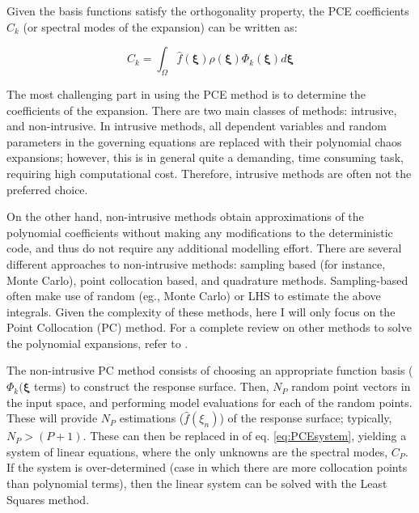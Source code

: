 \documentclass[12pt]{article}
\begin{document}
Given the basis functions satisfy the orthogonality property, the PCE coefficients $C_{k}$  (or spectral modes of the expansion) can be written as:


\begin{equation}
C_{k}=\int^{}_{\Omega}\hat f(\mathbf{\xi}) \rho (\mathbf{\xi})\Phi_{k}(\mathbf{\xi})d\mathbf{\xi}
\end{equation}


The most challenging part in using the PCE method is to determine the coefficients of the expansion. There are two main classes of methods: intrusive, and non-intrusive. In intrusive methods, all dependent variables and random parameters in the governing equations are replaced with their polynomial chaos expansions; however, this is in general quite a demanding, time consuming task, requiring high computational cost. Therefore, intrusive methods are often not the preferred choice. 

On the other hand, non-intrusive methods obtain approximations of the polynomial coefficients without making any modifications to the deterministic code, and thus do not require any additional modelling effort. There are several different approaches to non-intrusive methods: sampling based (for instance, Monte Carlo), point collocation based, and quadrature methods. Sampling-based often make use of random (eg., Monte Carlo) or LHS to estimate the above integrals. Given the complexity of these methods, here I will only focus on the Point Collocation (PC) method. For a complete review on other methods to solve the polynomial expansions, refer to \cite{HELTON20061175,Wiener}.

The non-intrusive PC method consists of choosing an appropriate function basis ($\Phi_{k}(\mathbf{\xi}$ terms) to construct the response surface. Then, $N_{P}$ random point vectors in the input space, and performing model evaluations for each of the random points. These will provide $N_{P}$ estimations ($ \hat f(\xi_{n})$) of the response surface; typically, $N_{P} > (P+1)$. These can then be replaced in of eq. \ref{eq:PCEsystem}, yielding a system of linear equations, where the only unknowns are the spectral modes, $ C_{P}$. If the system is over-determined (case in which there are more collocation points than polynomial terms), then the linear system can be solved with the Least Squares method. 
 
\end{document}
